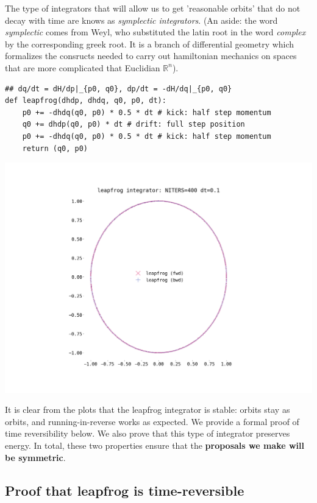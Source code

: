 \documentclass[titlepage]{article}
\newcommand{\R}{\mathbb{R}}
\begin{document}
The type of integrators that will allow us to get 'reasonable orbits' that
do not decay with time are knows as \emph{symplectic integrators}.
(An aside: the word \emph{symplectic} comes from Weyl, who substituted
the latin root in the word \emph{complex} by the corresponding greek root.
It is a branch of differential geometry which formalizes the consructs
needed to carry out hamiltonian mechanics on spaces that are more complicated
that Euclidian $\R^n$).

\begin{verbatim}
## dq/dt = dH/dp|_{p0, q0}, dp/dt = -dH/dq|_{p0, q0}
def leapfrog(dhdp, dhdq, q0, p0, dt):
    p0 += -dhdq(q0, p0) * 0.5 * dt # kick: half step momentum
    q0 += dhdp(q0, p0) * dt # drift: full step position
    p0 += -dhdq(q0, p0) * 0.5 * dt # kick: half step momentum
    return (q0, p0)
\end{verbatim}


\includegraphics[width=\textwidth]{./leapfrog-dt-0-1.png}

It is clear from the plots that the leapfrog integrator is stable: orbits
stay as orbits, and running-in-reverse works as expected. We provide
a formal proof of time reversibility below. We also prove that this
type of integrator preserves energy. In total, these two properties
ensure that the \textbf{proposals we make will be symmetric}.

\subsection{Proof that leapfrog is time-reversible}
\end{document}
